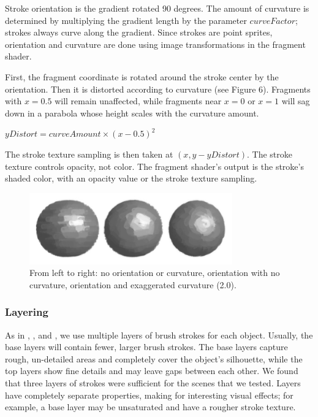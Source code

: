 \documentclass[conference]{acmsiggraph}
\begin{document}
Stroke orientation is the gradient rotated 90 degrees. The amount of curvature
is determined by multiplying the gradient length by the parameter
$curveFactor$; strokes always curve along the gradient. Since strokes
are point sprites, orientation and curvature are done using image
transformations in the fragment shader.

First, the fragment coordinate is rotated around the stroke center by the
orientation. Then it is distorted according to curvature (see Figure 6).
Fragments with $x = 0.5$ will remain unaffected, while fragments near $x = 0$
or $x = 1$ will sag down in a parabola whose height scales with the curvature
amount.

$yDistort = curveAmount \times (x - 0.5)^2$

The stroke texture sampling is then taken at $(x, y - yDistort)$. The stroke
texture controls opacity, not color. The fragment shader's output is the
stroke's shaded color, with an opacity value or the stroke texture sampling.


\begin{figure}
  \centering
  \includegraphics[width=3.45in]{images/sphere_rotation_curve}
  \caption{From left to right: no orientation or curvature, orientation with
           no curvature, orientation and exaggerated curvature (2.0).}
\end{figure}


\subsubsection{Layering}

As in \cite{Hertzmann:1998:PRC:280814.280951},
\cite{Meier:1996:PRA:237170.237288}, and \cite{Lu:2010:IPS:1730804.1730825}, we
use multiple layers of brush strokes for each object. Usually, the base layers
will contain fewer, larger brush strokes. The base layers capture rough,
un-detailed areas and completely cover the object's silhouette, while the top
layers show fine details and may leave gaps between each other. We found that
three layers of strokes were sufficient for the scenes that we tested. Layers
have completely separate properties, making for interesting visual effects; for
example, a base layer may be unsaturated and have a rougher stroke texture.
\end{document}
